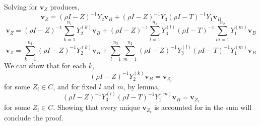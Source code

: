 \documentclass{paper}
\begin{document}
Solving for $\mathbf{v}_Z$ produces,
\[
\mathbf{v}_Z = (\rho I - Z)^{-1}Y_2\mathbf{v}_B + (\rho I - Z)^{-1}Y_3(\rho I - T)^{-1}Y_1\mathbf{v}_B
\]
\[
\mathbf{v}_Z = (\rho I - Z)^{-1} \sum_{k=1}^{n_1}Y_2^{(k)}\mathbf{v}_B + (\rho I - Z)^{-1}\sum_{l=1}^{n_3}Y_3^{(l)}(\rho I - T)^{-1}\sum_{m=1}^{n_2}Y_1^{(m)}\mathbf{v}_B
\]
\[
\mathbf{v}_Z = \sum_{k=1}^{n_1}(\rho I - Z)^{-1} Y_2^{(k)}\mathbf{v}_B + \sum_{l=1}^{n_3}\sum_{m=1}^{n_2}(\rho I - Z)^{-1}Y_3^{(l)}(\rho I - T)^{-1}Y_1^{(m)}\mathbf{v}_B
\]
We can show that for each $k$,
\[
(\rho I - Z)^{-1} Y_2^{(k)}\mathbf{v}_B = \mathbf{v}_{Z_i} 
\]
for some $Z_i \in C$, and for fixed $l$ and $m$, by lemma,
\[
(\rho I - Z)^{-1}Y_3^{(l)}(\rho I - T)^{-1}Y_1^{(m)}\mathbf{v}_B = \mathbf{v}_{Z_i} 
\]
for some $Z_i \in C$. Showing that every unique $\mathbf{v}_{Z_i}$ is accounted for in the sum will conclude the proof.
\end{document}
